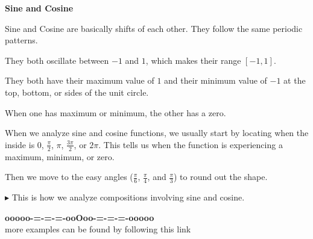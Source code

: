 \documentclass{ximera}
\begin{document}
\begin{summary} \textbf{\textcolor{red!70!yellow}{Sine and Cosine}}   


Sine and Cosine are basically shifts of each other.  They follow the same periodic patterns. 

They both oscillate between $-1$ and $1$, which makes their range $[-1,1]$. 

They both have their maximum value of $1$ and their minimum value of $-1$ at the top, bottom, or sides of the unit circle. 

When one has maximum or minimum, the other has a zero. 

\end{summary}


When we analyze sine and cosine functions, we usually start by locating when the inside is $0$, $\frac{\pi}{2}$, $\pi$, $\frac{3\pi}{2}$, or $2\pi$.  This tells us when the function is experiencing a maximum, minimum, or zero.

Then we move to the easy angles ($\frac{\pi}{6}$, $\frac{\pi}{4}$, and $\frac{\pi}{3}$) to round out the shape. 





\textbf{\textcolor{red!80!black}{$\blacktriangleright$}} This is how we analyze compositions involving sine and cosine.


















\begin{center}
\textbf{\textcolor{green!50!black}{ooooo-=-=-=-ooOoo-=-=-=-ooooo}} \\

more examples can be found by following this link\\ 

\end{center}
\end{document}
